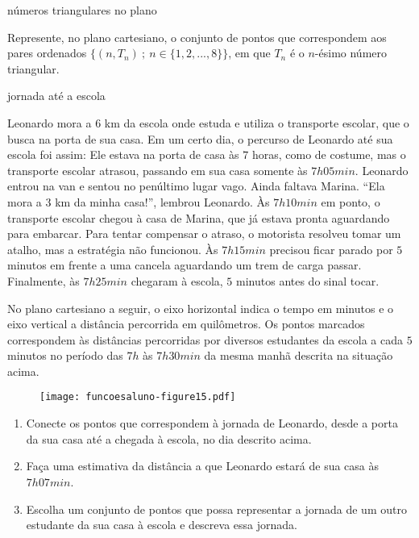 \documentclass[extrafontsizes, twoside, 11pt, openright, final]{memoir}
\begin{document}
\begin{task}{ números triangulares no plano}
	\label{\detokenize{AF106-4:atividade-numeros-triangulares-no-plano}}\label{\detokenize{AF106-4:ativ-funcoes-numeros-triangulares}}

	Represente, no plano cartesiano, o conjunto de pontos que correspondem aos pares ordenados $\{(n,T_n)\ ;\ n\in\{1,2,...,8\}\}$, em que $T_n$ é o $n$-ésimo número triangular.

\end{task}

\begin{task}{ jornada até a escola}
	\label{\detokenize{AF106-4:atividade-jornada-ate-a-escola}}\label{\detokenize{AF106-4:ativ-funcoes-jornada-ate-a-escola}}

	Leonardo mora a $6$ km da escola onde estuda e utiliza o transporte escolar, que o busca na porta de sua casa. Em um certo dia, o percurso de Leonardo até sua escola foi assim: Ele estava na porta de casa às $7$ horas, como de costume, mas o transporte escolar atrasou, passando em sua casa somente às $7h05min$. Leonardo entrou na van e sentou no penúltimo lugar vago. Ainda faltava Marina. “Ela mora a $3$ km da minha casa!”, lembrou Leonardo. Às $7h10min$ em ponto, o transporte escolar chegou à casa de Marina, que já estava pronta aguardando para embarcar. Para tentar compensar o atraso, o motorista resolveu tomar um atalho, mas a estratégia não funcionou. Às $7h15min$ precisou ficar parado por $5$ minutos em frente a uma cancela aguardando um trem de carga passar. Finalmente, às $7h25min$ chegaram à escola, $5$ minutos antes do sinal tocar.

	No plano cartesiano a seguir, o eixo horizontal indica o tempo em minutos e o eixo vertical a distância percorrida em quilômetros. Os pontos marcados correspondem às distâncias percorridas por diversos estudantes da escola a cada $5$ minutos no período das $7h$ às $7h30min$ da mesma manhã descrita na situação acima.

	\label{\detokenize{AF106-4:fig-pontos-jornada}}
	\begin{figure}[H]
		\begin{center}
			\centering

			\texttt{[image: funcoesaluno-figure15.pdf]}
		\end{center}
	\end{figure}


	\begin{enumerate}
		\item Conecte os pontos que correspondem à jornada de Leonardo, desde a porta da sua casa até a chegada à escola, no dia descrito acima.

		\item Faça uma estimativa da distância a que Leonardo estará de sua casa às $7h07min$.

		\item Escolha um conjunto de pontos que possa representar a jornada de um outro estudante da sua casa à escola e descreva essa jornada.

	\end{enumerate}
\end{task}
\end{document}
